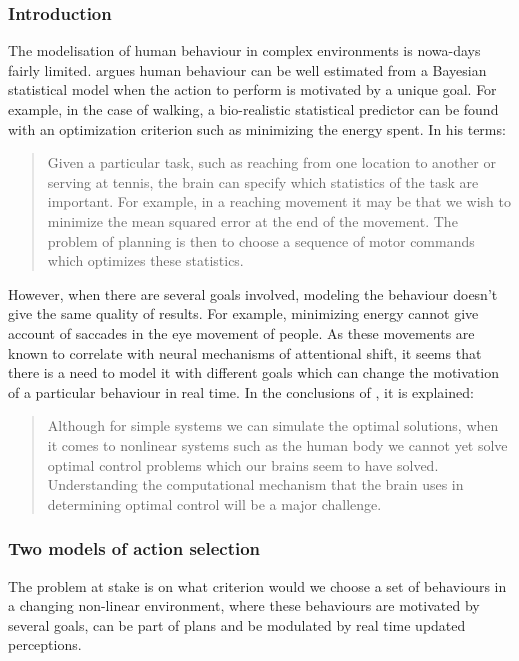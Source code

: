 \documentclass[
		twoside,openright,titlepage,numbers=noenddot,manychapters,
		headinclude,%
                footinclude=false,cleardoublepage=empty,
                BCOR=5mm,
		fontsize=11pt, %
                 enabledeprecatedfontcommands]{scrreprt}
\begin{document}
\label{modelling_behaviour}


\subsubsection{Introduction}
 The modelisation of human behaviour in complex environments is nowa-days fairly limited. \cite{wolpert2007probabilistic} argues human behaviour can be well estimated from a Bayesian statistical model when the action to perform is motivated by a unique goal. For example, in the case of walking, a bio-realistic statistical predictor can be found with an optimization criterion such as minimizing the energy spent. In his terms:

\begin{quote}
Given a particular task, such as reaching from one location to another or serving at tennis, the brain can specify which statistics of the task are important. For example, in a reaching movement it may be that we wish to minimize the mean squared error at the end of the movement. The problem of planning is then to choose a sequence of motor commands which optimizes these statistics.
\end{quote}

However, when there are several goals involved, modeling the behaviour doesn't give the same quality of results. For example, minimizing energy cannot give account of saccades in the eye movement of people. As these movements are known to correlate with neural mechanisms of attentional shift, it seems that there is a need to model it with different goals which can change the motivation of a particular behaviour in real time.  In the conclusions of \cite{wolpert2007probabilistic} , it is explained: 

\begin{quote} Although for simple systems we can simulate the optimal solutions, when it comes to nonlinear systems such as the human body we cannot yet solve optimal control problems which our brains seem to have solved. Understanding the computational mechanism that the brain uses in determining optimal control will be a major challenge.
\end{quote}

\subsubsection{Two models of action selection}

The problem at stake is on what criterion would we choose a set of behaviours in a changing non-linear environment, where these behaviours are motivated by several goals, can be part of plans and be modulated by real time updated perceptions. 
\end{document}

